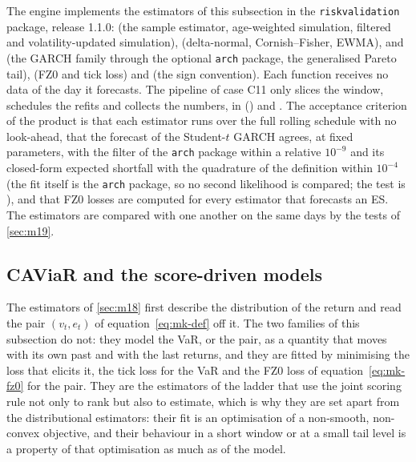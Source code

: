 The engine implements the estimators of this subsection in the \texttt{riskvalidation} package, release 1.1.0:
 (the sample estimator, age-weighted simulation, filtered and volatility-updated simulation),
 (delta-normal, Cornish--Fisher, EWMA),  and
 (the GARCH family through the optional \texttt{arch} package, the generalised Pareto tail),
 (FZ0 and tick loss) and
 (the sign convention). Each function receives no data of the day it forecasts. The pipeline of
case C11 only slices the window, schedules the refits and collects the numbers, in 
() and . The acceptance criterion of the product is that each estimator runs over the full rolling schedule
with no look-ahead, that the forecast of the Student-$t$ GARCH agrees, at fixed parameters, with the filter of the \texttt{arch} package within a relative $10^{-9}$ and its closed-form expected shortfall with the quadrature of the definition within $10^{-4}$ (the fit itself is the \texttt{arch} package, so no second likelihood is compared; the test is ), and that FZ0 losses are computed for every
estimator that forecasts an ES. The estimators are compared with one another on the same days by the tests of \cref{sec:m19}.

\subsection{CAViaR and the score-driven models}
\label{sec:m38}
The estimators of \cref{sec:m18} first describe the distribution of the return and read the pair $(v_t,e_t)$ of equation~\eqref{eq:mk-def} off
it. The two families of this subsection do not: they model the VaR, or the pair, as a quantity that moves with its own past and with the last
returns, and they are fitted by minimising the loss that elicits it, the tick loss for the VaR and the FZ0 loss of
equation~\eqref{eq:mk-fz0} for the pair. They are the estimators of the ladder that use the joint scoring rule not only to rank
but also to estimate, which is why they are set apart from the distributional estimators: their fit is an optimisation of a non-smooth,
non-convex objective, and their behaviour in a short window or at a small tail level is a property of that optimisation as much as of the model.

